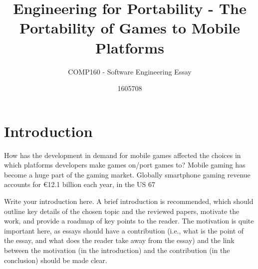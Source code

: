 \documentclass{scrartcl}
\title{Engineering for Portability - The Portability of Games to Mobile Platforms}
\subtitle{COMP160 - Software Engineering Essay}
\author{1605708}
\begin{document}
\maketitle


\section{Introduction}

How has the development in demand for mobile games affected the choices in which platforms developers make games on/port games to?
Mobile gaming has become a huge part of the gaming market. Globally smartphone gaming revenue accounts for €12.1 billion each year, in the US 67%


Write your introduction here. A brief introduction is recommended, which should outline key details of the chosen topic and the reviewed papers, motivate the work, and provide a roadmap of key points to the reader. The motivation is quite important here, as essays should have a contribution (i.e., what is the point of the essay, and what does the reader take away from the essay) and the link between the motivation (in the introduction) and the contribution (in the conclusion) should be made clear. \cite{sims_2016}

\section{}
\end{document}
